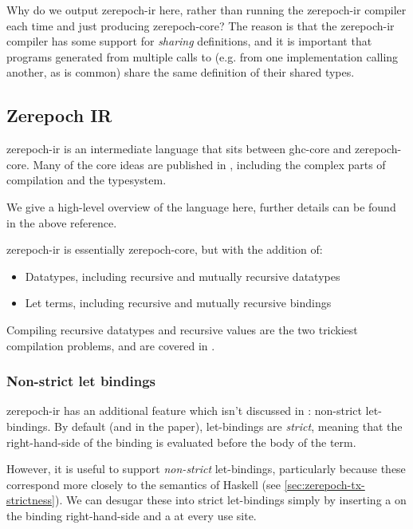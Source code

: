 Why do we output \gls{zerepoch-ir} here, rather than running the \gls{zerepoch-ir} compiler each time and just producing \gls{zerepoch-core}?
The reason is that the \gls{zerepoch-ir} compiler has some support for \emph{sharing} definitions, and it is important that programs generated from multiple calls to  (e.g. from one implementation calling another, as is common) share the same definition of their shared types.

\subsection{Zerepoch IR}
\label{sec:zerepoch-ir}

\Gls{zerepoch-ir} is an intermediate language that sits between \gls{ghc-core} and \gls{zerepoch-core}.
Many of the core ideas are published in \textcite{peytonjones2019unraveling}, including the complex parts of compilation and the typesystem.

We give a high-level overview of the language here, further details can be found in the above reference.

\Gls{zerepoch-ir} is essentially \gls{zerepoch-core}, but with the addition of:
\begin{itemize}
\item Datatypes, including recursive and mutually recursive datatypes
\item Let terms, including recursive and mutually recursive bindings
\end{itemize}

Compiling recursive datatypes and recursive values are the two trickiest compilation problems, and are covered in \textcite{peytonjones2019unraveling}.

\subsubsection{Non-strict let bindings}
\label{sec:pir-non-strict}

\Gls{zerepoch-ir} has an additional feature which isn't discussed in \textcite{peytonjones2019unraveling}: non-strict let-bindings.
By default (and in the paper), let-bindings are \emph{strict}, meaning that the right-hand-side of the binding is evaluated before the body of the term.

However, it is useful to support \emph{non-strict} let-bindings, particularly because these correspond more closely to the semantics of Haskell (see \cref{sec:zerepoch-tx-strictness}).
We can desugar these into strict let-bindings simply by inserting a  on the binding right-hand-side and a  at every use site.

